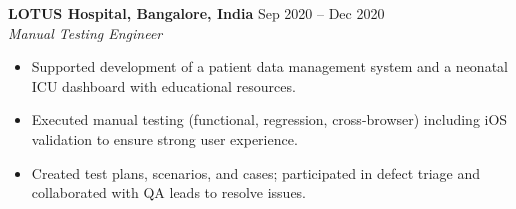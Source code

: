 \textbf{LOTUS Hospital, Bangalore, India} \hfill Sep 2020 -- Dec 2020\\
\textit{Manual Testing Engineer}\\
\begin{itemize}
  \item Supported development of a patient data management system and a neonatal ICU dashboard with educational resources.
  \item Executed manual testing (functional, regression, cross-browser) including iOS validation to ensure strong user experience.
  \item Created test plans, scenarios, and cases; participated in defect triage and collaborated with QA leads to resolve issues.
\end{itemize}
